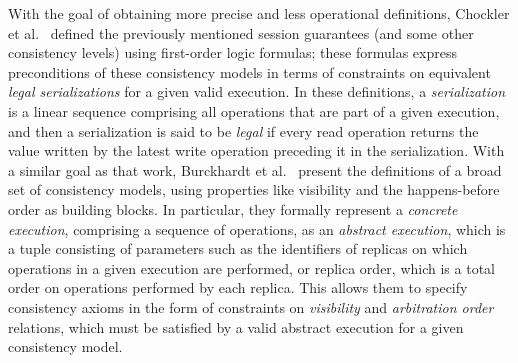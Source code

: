 \documentclass[journal,compsoc]{IEEEtran}
\begin{document}
 With the goal of obtaining more precise and less operational definitions, 
Chockler et al.~\cite{Chockler2000} defined the previously mentioned session guarantees (and some other consistency levels) using first-order logic formulas; these formulas express preconditions of these consistency models in terms of constraints on equivalent \emph{legal serializations} for a given valid execution. In these definitions, a \emph{serialization} is a linear sequence comprising all operations that are part of a given execution, and then a serialization is said to be \emph{legal} if every read operation returns the value written by the latest write operation preceding it in the serialization.
With a similar goal as that work, Burckhardt et al.~\cite{DBLP:conf/popl/BurckhardtGYZ14, understanding-eventual-consistency, Burckhardt:2014:PEC:2693641.2693642} present the definitions of a broad set of consistency models, using properties like visibility and the happens-before order as building blocks. In particular, they formally represent a \emph{concrete  execution}, comprising a sequence of operations, as an \emph{abstract execution}, which is a tuple consisting of parameters such as the identifiers of replicas on which operations in a given execution are performed, or replica order, which is a total order on operations performed by each replica.  %
 This allows them to specify consistency axioms in the form of constraints on \emph{visibility}  and \emph{arbitration order}  relations, which must be satisfied by a valid abstract execution for a given consistency model.   
\end{document}
